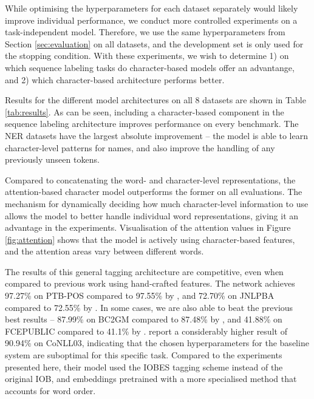 \documentclass[11pt]{article}
\begin{document}
While optimising the hyperparameters for each dataset separately would likely improve individual performance, we conduct more controlled experiments on a task-independent model. Therefore, we use the same hyperparameters from Section \ref{sec:evaluation} on all datasets, and the development set is only used for the stopping condition.
With these experiments, we wish to determine 1) on which sequence labeling tasks do character-based models offer an advantange, and 2) which character-based architecture performs better.

Results for the different model architectures on all 8 datasets are shown in Table \ref{tab:results}. As can be seen, including a character-based component in the sequence labeling architecture improves performance on every benchmark. The NER datasets have the largest absolute improvement -- the model is able to learn character-level patterns for names, and also improve the handling of any previously unseen tokens. 

Compared to concatenating the word- and character-level representations, the attention-based character model outperforms the former on all evaluations. The mechanism for dynamically deciding how much character-level information to use allows the model to better handle individual word representations, giving it an advantage in the experiments. Visualisation of the attention values in Figure \ref{fig:attention} shows that the model is actively using character-based features, and the attention areas vary between different words.

The results of this general tagging architecture are competitive, even when compared to previous work using hand-crafted features. The network achieves 97.27\% on PTB-POS compared to 97.55\% by , and 72.70\% on JNLPBA compared to 72.55\% by .
In some cases, we are also able to beat the previous best results -- 87.99\% on BC2GM compared to 87.48\% by , and 41.88\% on FCEPUBLIC compared to 41.1\% by .
 report a considerably higher result of 90.94\% on CoNLL03, indicating that the chosen hyperparameters for the baseline system are suboptimal for this specific task. Compared to the experiments presented here, their model used the IOBES tagging scheme instead of the original IOB, and embeddings pretrained with a more specialised method that accounts for word order.
\end{document}
